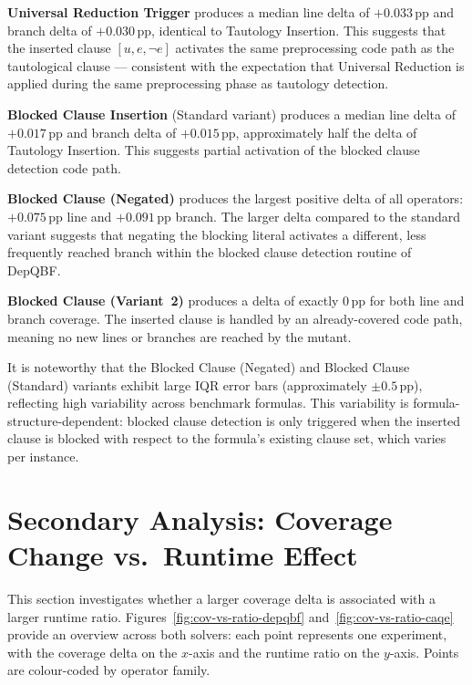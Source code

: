 \textbf{Universal Reduction Trigger} produces a median line delta of
$+0.033\,\text{pp}$ and branch delta of $+0.030\,\text{pp}$, identical to
Tautology Insertion.
This suggests that the inserted clause $[u, e, \neg e]$ activates the same
preprocessing code path as the tautological clause — consistent with the
expectation that Universal Reduction is applied during the same preprocessing
phase as tautology detection.
 
\textbf{Blocked Clause Insertion} (Standard variant) produces a median line
delta of $+0.017\,\text{pp}$ and branch delta of $+0.015\,\text{pp}$,
approximately half the delta of Tautology Insertion. This suggests partial
activation of the blocked clause detection code path.
 
\textbf{Blocked Clause (Negated)} produces the largest positive delta of all
operators: $+0.075\,\text{pp}$ line and $+0.091\,\text{pp}$ branch. The larger
delta compared to the standard variant suggests that negating the blocking literal
activates a different, less frequently reached branch within the blocked clause
detection routine of DepQBF.
 
\textbf{Blocked Clause (Variant~2)} produces a delta of exactly $0\,\text{pp}$
for both line and branch coverage. The inserted clause is handled by an
already-covered code path, meaning no new lines or branches are reached by the mutant.

It is noteworthy that the Blocked Clause (Negated) and Blocked Clause (Standard)
variants exhibit large IQR error bars (approximately $\pm 0.5\,\text{pp}$),
reflecting high variability across benchmark formulas. This variability is
formula-structure-dependent: blocked clause detection is only triggered when the
inserted clause is blocked with respect to the formula's existing clause set,
which varies per instance.

\section{Secondary Analysis: Coverage Change vs.\ Runtime Effect}\label{sec:secondary}

This section investigates whether a larger coverage delta is associated with a larger runtime ratio. Figures~\ref{fig:cov-vs-ratio-depqbf} and~\ref{fig:cov-vs-ratio-caqe} provide an overview across both solvers: each point represents one experiment, with the coverage delta on the $x$-axis and the runtime ratio on the $y$-axis. Points are colour-coded by operator family.

